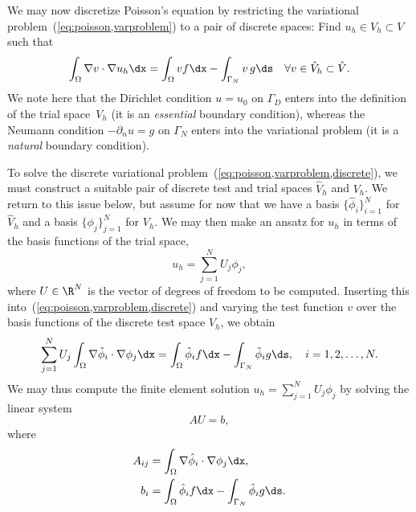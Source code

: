 We may now discretize Poisson's equation by restricting the
variational problem~(\ref{eq:poisson,varproblem}) to a pair of
discrete spaces: Find $u_h \in V_h \subset V$ such that
\begin{equation} \label{eq:poisson,varproblem,discrete}
  \int_{\Omega} \nabla v \cdot \nabla u_h \dx =
  \int_{\Omega} v f \dx - \int_{\Gamma_N} v \, g \ds
  \quad \forall v \in \hat{V}_h \subset \hat{V}.
\end{equation}
We note here that the Dirichlet condition $u = u_0$ on $\Gamma_D$
enters into the definition of the trial space~$V_h$ (it is
an \emph{essential} boundary condition), whereas the Neumann
condition $-\partial_n u = g$ on $\Gamma_N$ enters into the
variational problem (it is a \emph{natural} boundary condition).

To solve the discrete variational
problem~(\ref{eq:poisson,varproblem,discrete}), we must construct a
suitable pair of discrete test and trial spaces $\hat{V}_h$ and $V_h$.
We return to this issue below, but assume for now that we have a basis
$\{\hat{\phi}_i\}_{i=1}^N$ for $\hat{V}_h$ and a basis
$\{\phi_j\}_{j=1}^N$ for $V_h$. We may then make an ansatz for $u_h$
in terms of the basis functions of the trial space,
\begin{displaymath}
  u_h = \sum_{j=1}^N U_j \phi_j,
\end{displaymath}
where $U \in \R^N$ is the vector of degrees of freedom to be computed.
Inserting this into~(\ref{eq:poisson,varproblem,discrete}) and varying
the test function $v$ over the basis functions of the discrete test
space $\hat{V}_h$, we obtain
\begin{displaymath}
  \sum_{j=1}^N U_j \int_{\Omega} \nabla \hat{\phi}_i \cdot \nabla \phi_j \dx =
  \int_{\Omega} \hat{\phi}_i f \dx - \int_{\Gamma_N} \hat{\phi}_i g \ds,
  \quad i = 1,2,\ldots,N.
\end{displaymath}
We may thus compute the finite element solution $u_h = \sum_{j=1}^N
U_j \phi_j$ by solving the linear system
\begin{displaymath}
  AU = b,
\end{displaymath}
where
\begin{displaymath}
\begin{split}
  A_{ij} &= \int_{\Omega} \nabla \hat{\phi}_i \cdot \nabla \phi_j \dx, \\
  b_i &= \int_{\Omega} \hat{\phi}_i f \dx - \int_{\Gamma_N} \hat{\phi}_i g \ds.
\end{split}
\end{displaymath}

